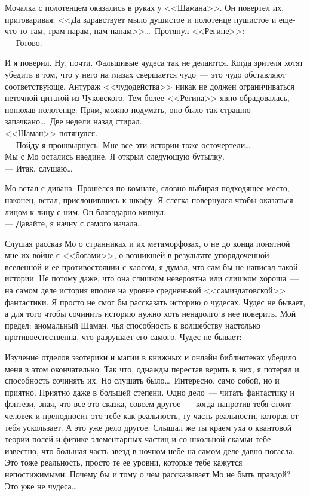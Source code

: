 Мочалка с полотенцем оказались в руках у <<Шамана>>. Он повертел их, 
приговаривая: 
<<Да здравствует мыло душистое и полотенце пушистое и еще-что-то там, 
трам-парам, 
пам-папам>>\ldots\ Протянул <<Регине>>:\\
--- Готово.

И я поверил. Ну, почти. Фальшивые чудеса так не делаются. Когда зрителя хотят 
убедить в том, что у него на глазах свершается чудо~--- это чудо обставляют 
соответствующе. Антураж <<чудодейства>> никак не должен ограничиваться неточной 
цитатой из Чуковского. Тем более <<Регина>> явно обрадовалась, понюхав 
полотенце. 
Прям, можно подумать, оно было так страшно запачкано\ldots\ Две недели назад 
стирал.\\
<<Шаман>> потянулся.\\
--- Пойду я прошвырнусь. Мне все эти истории тоже осточертели\ldots\\
Мы с Мо остались наедине. Я открыл следующую бутылку.\\
--- Итак, слушаю\ldots

Мо встал с дивана. Прошелся по комнате, словно выбирая подходящее место, 
наконец, встал, прислонившись к шкафу. Я слегка повернулся чтобы оказаться 
лицом к лицу с ним. Он благодарно кивнул.\\
--- Давайте, я начну с самого начала\ldots

\newpage

Слушая рассказ Мо о странниках и их метаморфозах, о не до конца понятной мне их 
войне с <<богами>>, о возникшей в результате упорядоченной вселенной и ее 
противостоянии с хаосом, я думал, что сам бы не написал такой истории. Не 
потому 
даже, что она слишком невероятна или слишком хороша~--- на самом деле история 
вполне на уровне средненькой <<самиздатовской>> фантастики. Я просто не смог бы 
рассказать историю о чудесах. Чудес не бывает, а для того чтобы сочинить 
историю 
нужно хоть ненадолго в нее поверить. Мой предел: аномальный Шаман, чья 
способность к волшебству настолько противоестественна, что разрушает его 
самого. 
Чудес не бывает:

Изучение отделов эзотерики и магии в книжных и онлайн библиотеках убедило меня 
в этом окончательно. Так что, однажды перестав верить в них, я потерял и 
способность сочинять их. Но слушать было\ldots\ Интересно, само собой, но и 
приятно. 
Приятно даже в большей степени. Одно дело~--- читать фантастику и фэнтези, 
зная, 
что все это сказка, совсем другое~--- когда напротив тебя стоит человек и 
преподносит это тебе как реальность, ту часть реальности, которая от тебя 
ускользает. А это уже дело другое. Слышал же ты краем уха о квантовой теории 
полей и физике элементарных частиц и со школьной скамьи тебе известно, что 
большая часть звезд в ночном небе на самом деле давно погасла. Это тоже 
реальность, просто те ее уровни, которые тебе кажутся непостижимыми. Почему бы 
и тому о чем рассказывает Мо не быть правдой? Это уже не чудеса\ldots

